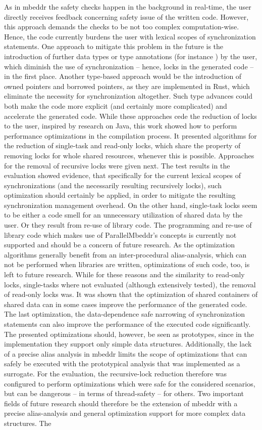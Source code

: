 As in mbeddr the safety checks happen in the background in real-time, the user directly receives feedback concerning safety issue of the written code. However, this approach demands the checks to be not too complex computation-wise. Hence, the code currently burdens the user with lexical scopes of synchronization statements. One approach to mitigate this problem in the future is the introduction of further data types or type annotations (for instance ) by the user, which diminish the use of synchronization -- hence, locks in the generated code -- in the first place. Another type-based approach would be the introduction of owned pointers and borrowed pointers, as they are implemented in Rust, which eliminate the necessity for synchronization altogether. Such type advances could both make the code more explicit (and certainly more complicated) and accelerate the generated code. While these approaches cede the reduction of locks to the user, inspired by research on Java, this work showed how to perform performance optimizations in the compilation process. It presented algorithms for the reduction of single-task and read-only locks, which share the property of removing locks for whole shared resources, whenever this is possible. Approaches for the removal of recursive locks were given next. The test results in the evaluation showed evidence, that specifically for the current lexical scopes of synchronizations (and the necessarily resulting recursively locks), such optimization should certainly be applied, in order to mitigate the resulting synchronization management overhead. On the other hand, single-task locks seem to be either a code smell for an unnecessary utilization of shared data by the user. Or they result from re-use of library code. The programming and re-use of library code which makes use of ParallelMbeddr's concepts is currently not supported and should be a concern of future research. As the optimization algorithms generally benefit from an inter-procedural alias-analysis, which can not be performed when libraries are written, optimizations of such code, too, is left to future research. While for these reasons and the similarity to read-only locks, single-tasks where not evaluated (although extensively tested), the removal of read-only locks was. It was shown that the optimization of shared containers of shared data can in some cases improve the performance of the generated code. The last optimization, the data-dependence safe narrowing of synchronization statements can also improve the performance of the executed code significantly. The presented optimizations should, however, be seen as prototypes, since in the implementation they support only simple data structures. Additionally, the lack of a precise alias analysis in mbeddr limits the scope of optimizations that can safely be executed with the prototypical analysis that was implemented as a surrogate. For the evaluation, the recursive-lock reduction therefore was configured to perform optimizations which were safe for the considered scenarios, but can be dangerous -- in terms of thread-safety -- for others. Two important fields of future research should therefore be the extension of mbeddr with a precise alias-analysis and general optimization support for more complex data structures. The 